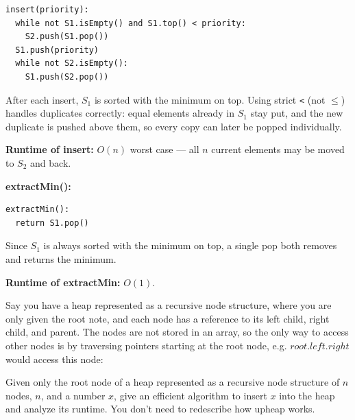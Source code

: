 \documentclass[addpoints]{exam}
\begin{document}
\begin{questions}
\begin{verbatim}
insert(priority):
  while not S1.isEmpty() and S1.top() < priority:
    S2.push(S1.pop())
  S1.push(priority)
  while not S2.isEmpty():
    S1.push(S2.pop())
\end{verbatim}

After each insert, $S_1$ is sorted with the minimum on top. Using strict \texttt{<} (not $\leq$) handles duplicates correctly: equal elements already in $S_1$ stay put, and the new duplicate is pushed above them, so every copy can later be popped individually.

\textbf{Runtime of insert:} $O(n)$ worst case --- all $n$ current elements may be moved to $S_2$ and back.

\bigskip
\textbf{extractMin():}

\begin{verbatim}
extractMin():
  return S1.pop()
\end{verbatim}

Since $S_1$ is always sorted with the minimum on top, a single pop both removes and returns the minimum.

\textbf{Runtime of extractMin:} $O(1)$.


\question[20] Say you have a heap represented as a recursive node structure, where you are only given the root note, and each node has a reference to its left child, right child, and parent. The nodes are not stored in an array, so the only way to access other nodes is by traversing pointers starting at the root node, e.g. $root.left.right$ would access this node:

\begin{center}
\end{center}

Given only the root node of a heap represented as a recursive node structure of $n$ nodes, $n$, and a number $x$, give an efficient algorithm to insert $x$ into the heap and analyze its runtime. You don't need to redescribe how upheap works.


\end{questions}
\end{document}
